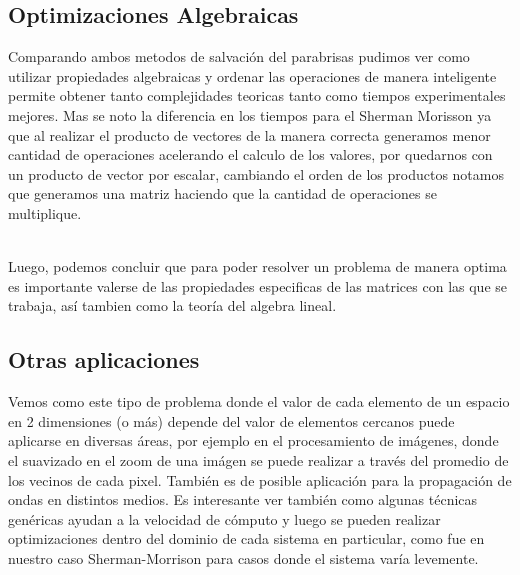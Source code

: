 \VER

\subsection{Optimizaciones Algebraicas}

Comparando ambos metodos de salvación del parabrisas pudimos ver como utilizar propiedades algebraicas y ordenar las operaciones de manera inteligente permite obtener tanto complejidades teoricas tanto como tiempos experimentales mejores. Mas se noto la diferencia en los tiempos para el Sherman Morisson ya que al realizar el producto de vectores de la manera correcta generamos menor cantidad de operaciones acelerando el calculo de los valores, por quedarnos con un producto de vector por escalar, cambiando el orden de los productos notamos que generamos una matriz haciendo que la cantidad de operaciones se multiplique.

\\
Luego, podemos concluir que para poder resolver un problema de manera optima es importante valerse de las propiedades especificas de las matrices con las que se trabaja, así tambien como la teoría del algebra lineal.

\subsection{Otras aplicaciones}

Vemos como este tipo de problema donde el valor de cada elemento de un espacio en 2 dimensiones (o m\'as) depende del valor de elementos cercanos puede aplicarse en diversas \'areas, por ejemplo en el procesamiento de im\'agenes, donde el suavizado en el zoom de una im\'agen se puede realizar a trav\'es del promedio de los vecinos de cada pixel. Tambi\'en es de posible aplicaci\'on para la propagaci\'on de ondas en distintos medios. Es interesante ver tambi\'en como algunas t\'ecnicas gen\'ericas ayudan a la velocidad de c\'omputo y luego se pueden realizar optimizaciones dentro del dominio de cada sistema en particular, como fue en nuestro caso Sherman-Morrison para casos donde el sistema var\'ia levemente.
